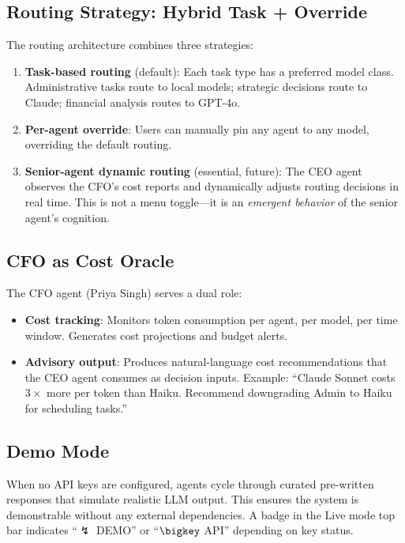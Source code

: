 \documentclass[11pt,letterpaper]{article}
\begin{document}
\subsection{Routing Strategy: Hybrid Task + Override}

The routing architecture combines three strategies:

\begin{enumerate}[leftmargin=2em]
  \item \textbf{Task-based routing} (default): Each task type has a preferred model class. Administrative tasks route to local models; strategic decisions route to Claude; financial analysis routes to GPT-4o.

  \item \textbf{Per-agent override}: Users can manually pin any agent to any model, overriding the default routing.

  \item \textbf{Senior-agent dynamic routing} (essential, future): The CEO agent observes the CFO's cost reports and dynamically adjusts routing decisions in real time. This is not a menu toggle---it is an \emph{emergent behavior} of the senior agent's cognition.
\end{enumerate}

\subsection{CFO as Cost Oracle}

The CFO agent (Priya Singh) serves a dual role:

\begin{itemize}[leftmargin=2em]
  \item \textbf{Cost tracking}: Monitors token consumption per agent, per model, per time window. Generates cost projections and budget alerts.
  \item \textbf{Advisory output}: Produces natural-language cost recommendations that the CEO agent consumes as decision inputs. Example: ``Claude Sonnet costs $3\times$ more per token than Haiku. Recommend downgrading Admin to Haiku for scheduling tasks.''
\end{itemize}

\subsection{Demo Mode}

When no API keys are configured, agents cycle through curated pre-written responses that simulate realistic LLM output. This ensures the system is demonstrable without any external dependencies. A badge in the Live mode top bar indicates ``$\lightning$ DEMO'' or ``$\bigkey$ API'' depending on key status.
\end{document}
